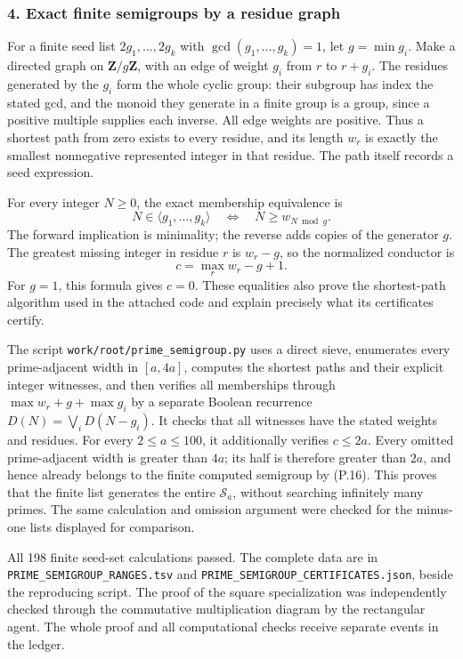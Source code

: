 \documentclass[
  10pt,
]{article}
\begin{document}
\subsubsection{4. Exact finite semigroups by a residue
graph}\label{exact-finite-semigroups-by-a-residue-graph}

For a finite seed list \(2g_1,\ldots,2g_k\) with
\(\gcd(g_1,\ldots,g_k)=1\), let \(g=\min g_i\). Make a directed graph on
\(\mathbf Z/g\mathbf Z\), with an edge of weight \(g_i\) from \(r\) to
\(r+g_i\). The residues generated by the \(g_i\) form the whole cyclic
group: their subgroup has index the stated gcd, and the monoid they
generate in a finite group is a group, since a positive multiple
supplies each inverse. All edge weights are positive. Thus a shortest
path from zero exists to every residue, and its length \(w_r\) is
exactly the smallest nonnegative represented integer in that residue.
The path itself records a seed expression.

For every integer \(N\ge0\), the exact membership equivalence is \[
 N\in\langle g_1,\ldots,g_k\rangle
 \quad\Longleftrightarrow\quad N\ge w_{N\bmod g}.
\tag{P.16}
\] The forward implication is minimality; the reverse adds copies of the
generator \(g\). The greatest missing integer in residue \(r\) is
\(w_r-g\), so the normalized conductor is \[
 c=\max_r w_r-g+1.
\tag{P.17}
\] For \(g=1\), this formula gives \(c=0\). These equalities also prove
the shortest-path algorithm used in the attached code and explain
precisely what its certificates certify.

The script
\texttt{\small work/\allowbreak{}root/\allowbreak{}prime\_\allowbreak{}semigroup.py}
uses a direct sieve, enumerates every prime-adjacent width in
\([a,4a]\), computes the shortest paths and their explicit integer
witnesses, and then verifies all memberships through
\(\max w_r+g+\max g_i\) by a separate Boolean recurrence
\(D(N)=\bigvee_iD(N-g_i)\). It checks that all witnesses have the stated
weights and residues. For every \(2\le a\le100\), it additionally
verifies \(c\le2a\). Every omitted prime-adjacent width is greater than
\(4a\); its half is therefore greater than \(2a\), and hence already
belongs to the finite computed semigroup by (P.16). This proves that the
finite list generates the entire \(\mathcal S_a\), without searching
infinitely many primes. The same calculation and omission argument were
checked for the minus-one lists displayed for comparison.

All 198 finite seed-set calculations passed. The complete data are in
\texttt{\small PRIME\_\allowbreak{}SEMIGROUP\_\allowbreak{}RANGES.tsv}
and
\texttt{\small PRIME\_\allowbreak{}SEMIGROUP\_\allowbreak{}CERTIFICATES.json},
beside the reproducing script. The proof of the square specialization
was independently checked through the commutative multiplication diagram
by the rectangular agent. The whole proof and all computational checks
receive separate events in the ledger.
\end{document}
